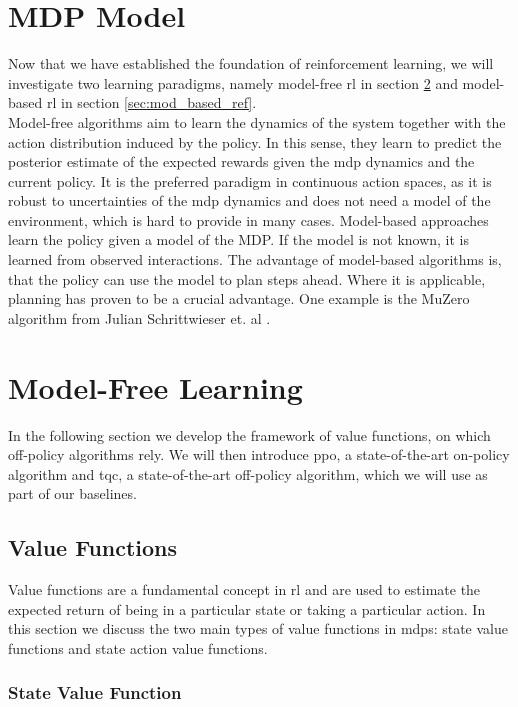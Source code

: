 \section{MDP Model}
Now that we have established the foundation of reinforcement learning, we will investigate two learning paradigms, 
namely model-free \ac{rl} in section \ref{sec:mod_free_ref} and model-based \ac{rl} in section \ref{sec:mod_based_ref}. \\

Model-free algorithms aim to learn the dynamics of the system together with the action distribution induced by the policy. In this sense, they learn to predict the posterior 
estimate of the expected rewards given the \ac{mdp} dynamics and the current policy. It is the preferred paradigm in continuous action spaces, 
as it is robust to uncertainties of the \ac{mdp} dynamics and does not need a model of the environment, which is hard to provide in many cases. 
Model-based approaches learn the policy given a model of the MDP. If the model is not known, it is learned 
from observed interactions. The advantage of model-based algorithms is, that the policy can use the model to plan steps ahead. 
Where it is applicable, planning has proven to be 
a crucial advantage. One example is the MuZero algorithm from Julian Schrittwieser et. al \cite{MUZero}.

\section{Model-Free Learning}
\label{sec:mod_free_ref}
In the following section we develop the framework of value functions, on which off-policy algorithms rely. 
We will then introduce \ac{ppo}, a state-of-the-art on-policy algorithm and \ac{tqc}, a state-of-the-art off-policy algorithm, 
which we will use as part of our baselines.

\subsection{Value Functions}

Value functions are a fundamental concept in \ac{rl} and are used to estimate the expected return of being in a 
particular state or taking a particular action. In this section we discuss the two main types of value functions in \ac{mdp}s: state 
value functions and state action value functions.

\subsubsection{State Value Function}

